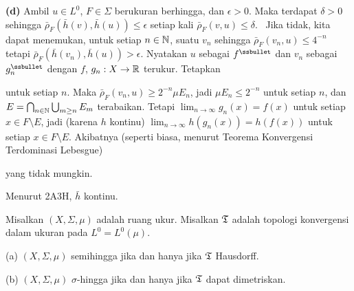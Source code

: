 {\medskip

{\bf (d)} Ambil $u\in L^0$, $F\in\Sigma$ berukuran berhingga, dan
$\epsilon>0$. Maka terdapat $\delta>0$ sehingga
$\bar\rho_F(\bar h(v),\bar h(u))\le\epsilon$ setiap
kali $\bar\rho_F(v,u)\le\delta$. \Prf\Quer\ Jika tidak, kita dapat menemukan,
untuk setiap $n\in\Bbb N$, suatu $v_n$ sehingga $\bar\rho_F(v_n,u)\le 4^{-n}$
tetapi $\bar\rho_F(\bar h(v_n),\bar h(u))>\epsilon$. Nyatakan $u$ sebagai
$f^{\ssbullet}$ dan $v_n$ sebagai $g_n^{\ssbullet}$ dengan $f$, $g_n:X\to\Bbb
R$ terukur. Tetapkan


\noindent untuk setiap $n$. Maka $\bar\rho_F(v_n,u)\ge 2^{-n}\mu E_n$,
jadi $\mu E_n\le 2^{-n}$ untuk setiap $n$, dan $E=\bigcap_{n\in\Bbb
N}\bigcup_{m\ge n}E_m$ terabaikan. Tetapi $\lim_{n\to\infty}g_n(x)=f(x)$
untuk setiap $x\in F\setminus E$, jadi (karena $h$ kontinu)
$\lim_{n\to\infty}h(g_n(x))=h(f(x))$ untuk setiap $x\in F\setminus E$.
Akibatnya (seperti biasa, menurut Teorema Konvergensi Terdominasi Lebesgue)


\noindent yang tidak mungkin.\ \Bang\Qed

Menurut 2A3H, $\bar h$ kontinu. }%




 Misalkan $(X,\Sigma,\mu)$ adalah ruang ukur. Misalkan
$\frak T$ adalah topologi konvergensi dalam ukuran pada
$L^0=L^0(\mu)$.

(a) $(X,\Sigma,\mu)$ semihingga jika dan hanya jika $\frak T$ Hausdorff.

(b) $(X,\Sigma,\mu)$ $\sigma$-hingga jika dan hanya jika $\frak T$ dapat
dimetriskan.

